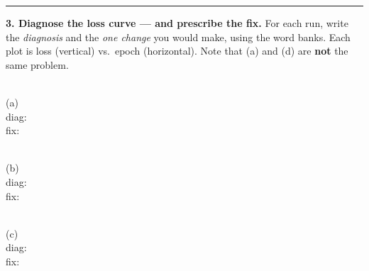 \documentclass[11pt]{article}
\newif\ifsolution
\newcommand{\blk}[1]{\underline{\hspace{#1}}}
\newcommand{\rb}[2]{\ifsolution\textbf{#1}\else\blk{#2}\fi}
\begin{document}
\vspace{2pt}\hrule\vspace{5pt}

\textbf{3. Diagnose the loss curve --- and prescribe the fix.}\; {\small For each run, write the
\emph{diagnosis} and the \emph{one change} you would make, using the word banks. Each plot is loss
(vertical) vs.\ epoch (horizontal). Note that (a) and (d) are \textbf{not} the same problem.}

\vspace{4pt}
\begin{center}
\newcommand{\lossaxes}{\draw[->,gray] (0,0)--(3.1,0); \draw[->,gray] (0,0)--(0,2.4);}
%
\begin{minipage}[t]{0.235\linewidth}\centering
{}\\[2pt]
{\footnotesize (a)}\\[3pt]
{\scriptsize diag:}\;\rb{far too high}{1.5cm}\\[4pt]
{\scriptsize fix:}\;\rb{lower a lot}{1.5cm}
\end{minipage}\hfill
%
\begin{minipage}[t]{0.235\linewidth}\centering
{}\\[2pt]
{\footnotesize (b)}\\[3pt]
{\scriptsize diag:}\;\rb{too low}{1.5cm}\\[4pt]
{\scriptsize fix:}\;\rb{raise it}{1.5cm}
\end{minipage}\hfill
%
\begin{minipage}[t]{0.235\linewidth}\centering
{}\\[2pt]
{\footnotesize (c)}\\[3pt]
{\scriptsize diag:}\;\rb{just right}{1.5cm}\\[4pt]
{\scriptsize fix:}\;\rb{keep it}{1.5cm}
\end{minipage}\hfill

\end{center}
\end{document}
